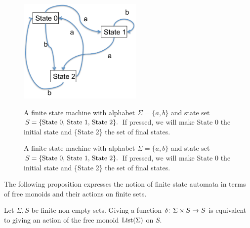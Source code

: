 \documentclass[CT4S-EN-RU]{subfiles}
\begin{document}
\begin{figure}[h]
\begin{center}
\includegraphics[height=2in]{FSM1}
\end{center}
\begin{blockENG}
\caption{A finite state machine with alphabet $\Sigma=\{a,b\}$ and state set $S=\{\textnormal{State 0, State 1, State 2}\}.$ If pressed, we will make State 0 the initial state and \{State 2\} the set of final states.}\label{fig:fsa}
\end{blockENG}
\begin{blockRUS}
\caption{A finite state machine with alphabet $\Sigma=\{a,b\}$ and state set $S=\{\textnormal{State 0, State 1, State 2}\}.$ If pressed, we will make State 0 the initial state and \{State 2\} the set of final states.}\label{fig:fsa}
\end{blockRUS}
\end{figure}

\begin{blockENG}
The following proposition expresses the notion of finite state automata in terms of free monoids and their actions on finite sets.
\end{blockENG}

\begin{blockRUS}
\end{blockRUS}

\begin{propositionENG}
Let $\Sigma, S$ be finite non-empty sets. Giving a function $\delta\colon\Sigma\times S\rightarrow S$ is equivalent to giving an action of the free monoid $\textnormal{List}(\Sigma)$ on $S.$
\end{propositionENG}

\begin{propositionRUS}
\end{propositionRUS}
\end{document}
